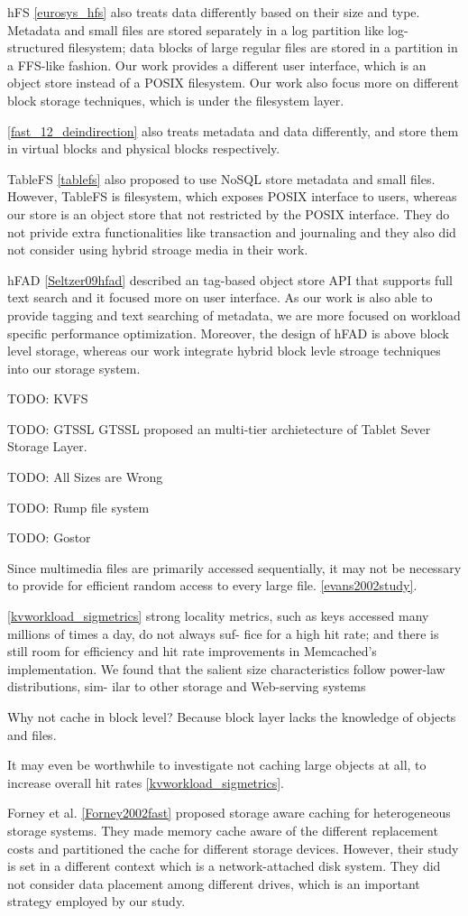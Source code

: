 hFS \ref{eurosys_hfs} also treats data differently based on their size and
type. Metadata and small files are stored separately in a log partition like
log-structured filesystem; data blocks of large regular files are stored in a
partition in a FFS-like fashion. Our work provides a different user interface,
which is an object store instead of a POSIX filesystem. Our work also focus
more on different block storage techniques, which is under the filesystem
layer.

\ref{fast_12_deindirection} also treats metadata and data differently, and
store them in virtual blocks and physical blocks respectively.

TableFS \ref{tablefs} also proposed to use NoSQL store metadata and small
files. However, TableFS is filesystem, which exposes POSIX interface to users,
whereas our store is an object store that not restricted by the POSIX
interface.  They do not privide extra functionalities like transaction and
journaling and they also did not consider using hybrid stroage media in their
work.

hFAD \ref{Seltzer09hfad} described an tag-based object store API that supports
full text search and it focused more on user interface. As our work is also
able to provide tagging and text searching of metadata, we are more focused on
workload specific performance optimization. Moreover, the design of hFAD is
above block level storage, whereas our work integrate hybrid block levle
stroage techniques into our storage system.

TODO: KVFS

TODO: GTSSL
GTSSL proposed an multi-tier archietecture of Tablet Sever Storage Layer.

TODO: All Sizes are Wrong

TODO: Rump file system

TODO: Gostor

Since multimedia files are primarily accessed sequentially, it may not be
necessary to provide for efficient random access to every large file.
\ref{evans2002study}.

\ref{kvworkload_sigmetrics} strong locality metrics, such as keys accessed many
millions of times a day, do not always suf- fice for a high hit rate; and there
is still room for efficiency and hit rate improvements in Memcached’s
implementation.  We found that the salient size characteristics follow
power-law distributions, sim- ilar to other storage and Web-serving systems

Why not cache in block level? Because block layer lacks the knowledge of
objects and files.  

It may even be worthwhile to investigate not caching large objects at all, to
increase overall hit rates \ref{kvworkload_sigmetrics}.

Forney et al. \ref{Forney2002fast} proposed storage aware caching for
heterogeneous storage systems. They made memory cache aware of the different
replacement costs and partitioned the cache for different storage devices.
However, their study is set in a different context which is a network-attached
disk system.  They did not consider data placement among different drives,
     which is an important strategy employed by our study.
